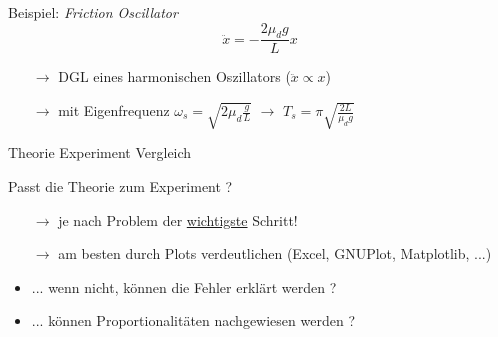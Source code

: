\documentclass[9pt]{beamer}
\begin{document}
\begin{frame}{Beispiel: \emph{Friction Oscillator}}
\begin{equation*}
\boxed{\ddot{x} = -\frac{2\mu_d g}{L} x} 
\end{equation*}
\pause
\begin{itemize}
\item[$\rightarrow$] DGL eines harmonischen Oszillators ($\ddot{x} \propto x$) 
\item[$\rightarrow$] mit Eigenfrequenz $\omega_s = \sqrt{2 \mu_d \frac{g}{L}}$ $\rightarrow$ $T_s = \pi\sqrt{\frac{2L}{\mu_d g}}$ \footnotemark
\end{itemize}

\end{frame}



\begin{frame}{Theorie Experiment Vergleich}
\begin{center}
\hspace*{-0.5cm}
\end{center}
\vfill
Passt die Theorie zum Experiment ?
\begin{itemize}
\item[$\rightarrow$] je nach Problem der \underline{wichtigste} Schritt!
\item[$\rightarrow$] am besten durch Plots verdeutlichen (Excel, GNUPlot, Matplotlib, ...)
\item ... wenn nicht, können die Fehler erklärt werden ?
\item ... können Proportionalitäten nachgewiesen werden ?
\end{itemize}
\end{frame}
\end{document}
